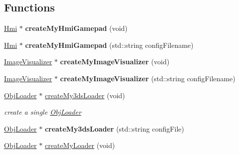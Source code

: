 \subsection*{Functions}
\begin{DoxyCompactItemize}
\item 
\hyperlink{classputar_1_1Hmi}{Hmi} $\ast$ {\bfseries create\+My\+Hmi\+Gamepad} (void)\hypertarget{namespaceputar_a07c9551507f081f35299e738e5df0739}{}\label{namespaceputar_a07c9551507f081f35299e738e5df0739}

\item 
\hyperlink{classputar_1_1Hmi}{Hmi} $\ast$ {\bfseries create\+My\+Hmi\+Gamepad} (std\+::string config\+Filename)\hypertarget{namespaceputar_abb9a094ef84d39575e3c6c3aa6800dc4}{}\label{namespaceputar_abb9a094ef84d39575e3c6c3aa6800dc4}

\item 
\hyperlink{classputar_1_1ImageVisualizer}{Image\+Visualizer} $\ast$ {\bfseries create\+My\+Image\+Visualizer} (void)\hypertarget{namespaceputar_a83c66ec1932bded19ad6caaf5f8f3b3d}{}\label{namespaceputar_a83c66ec1932bded19ad6caaf5f8f3b3d}

\item 
\hyperlink{classputar_1_1ImageVisualizer}{Image\+Visualizer} $\ast$ {\bfseries create\+My\+Image\+Visualizer} (std\+::string config\+Filename)\hypertarget{namespaceputar_a3d9bc80f022fe9d2dd490daab1a06158}{}\label{namespaceputar_a3d9bc80f022fe9d2dd490daab1a06158}

\item 
\hyperlink{classputar_1_1ObjLoader}{Obj\+Loader} $\ast$ \hyperlink{namespaceputar_a6b76c4a83de676f506ccfb24399705fb}{create\+My3ds\+Loader} (void)\hypertarget{namespaceputar_a6b76c4a83de676f506ccfb24399705fb}{}\label{namespaceputar_a6b76c4a83de676f506ccfb24399705fb}

\begin{DoxyCompactList}\small\item\em create a single \hyperlink{classputar_1_1ObjLoader}{Obj\+Loader} \end{DoxyCompactList}\item 
\hyperlink{classputar_1_1ObjLoader}{Obj\+Loader} $\ast$ {\bfseries create\+My3ds\+Loader} (std\+::string config\+File)\hypertarget{namespaceputar_a631859f4fce1b129afd30aa34b54b728}{}\label{namespaceputar_a631859f4fce1b129afd30aa34b54b728}

\item 
\hyperlink{classputar_1_1ObjLoader}{Obj\+Loader} $\ast$ \hyperlink{namespaceputar_ad2bde0bc3257e7e3e2d8c2fa6311d42d}{create\+My\+Loader} (void)\hypertarget{namespaceputar_ad2bde0bc3257e7e3e2d8c2fa6311d42d}{}\label{namespaceputar_ad2bde0bc3257e7e3e2d8c2fa6311d42d}


\end{DoxyCompactItemize}
